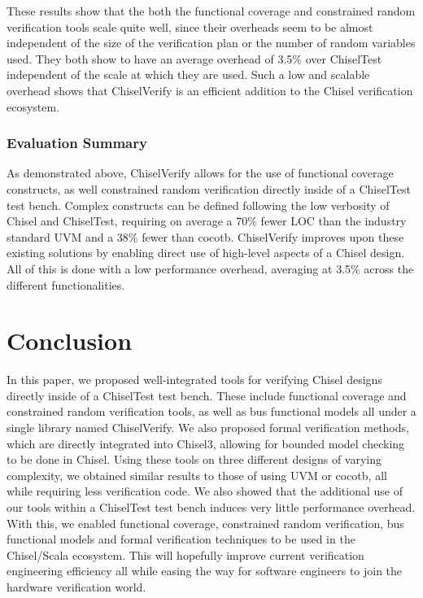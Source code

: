 \documentclass[conference]{IEEEtran}
\begin{document}
These results show that the both the functional coverage and constrained random verification tools scale quite well, since their overheads seem to be almost independent of the size of the verification plan or the number of random variables used.
They both show to have an average overhead of 3.5\% over ChiselTest independent of the scale at which they are used.
Such a low and scalable overhead shows that ChiselVerify is an efficient addition to the Chisel verification ecosystem.

\subsubsection{Evaluation Summary}
As demonstrated above, ChiselVerify allows for the use of functional coverage constructs, as well constrained random verification directly inside of a ChiselTest test bench. 
Complex constructs can be defined following the low verbosity of Chisel and ChiselTest, requiring on average a 70\% fewer LOC than the industry standard UVM and a 38\% fewer than cocotb.
ChiselVerify improves upon these existing solutions by enabling direct use of high-level aspects of a Chisel design.
All of this is done with a low performance overhead, averaging at 3.5\% across the different functionalities.

\section{Conclusion}
\label{sec:conclude}

In this paper, we proposed well-integrated tools for verifying Chisel designs directly inside of a ChiselTest test bench. 
These include functional coverage and constrained random verification tools, as well as bus functional models all under a single library named ChiselVerify.
We also proposed formal verification methods, which are directly integrated into Chisel3, allowing for bounded model checking to be done in Chisel.
Using these tools on three different designs of varying complexity, we obtained similar results to those of using UVM or cocotb, all while requiring less verification code.
We also showed that the additional use of our tools within a ChiselTest test bench induces very little performance overhead.
With this, we enabled functional coverage, constrained random verification, bus functional models and formal verification techniques to be used in the Chisel/Scala ecosystem.
This will hopefully improve current verification engineering efficiency all while easing the way for software engineers to join the hardware verification world.
\end{document}
